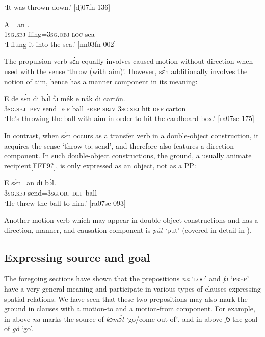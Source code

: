 \glt ‘It was thrown down.’ [dj07fn 136]
\z


\ea%
    \label{ex:key:967}
    \gll A    =an      .\\
\textsc{1sg.sbj}  fling=\textsc{3sg.obj}  \textsc{loc}  sea\\

\glt ‘I flung it into the sea.’ [nn03fn 002]
\z

The propulsion verb sɛ́n equally involves caused motion without direction when used with the sense ‘throw (with aim)’. However, sɛ́n additionally involves the notion of aim, hence has a manner component in its meaning:


\ea%
    \label{ex:key:968}
    \gll E    de  sɛ́n    di  bɔ́l  fɔ  mék  e    nák  di  cartón.\\
\textsc{3sg.sbj}  \textsc{ipfv}  send  \textsc{def}  ball  \textsc{prep}  \textsc{sbjv}  \textsc{3sg.sbj}  hit  \textsc{def}  carton\\

\glt ‘He’s throwing the ball with aim in order to hit the cardboard box.’ [ra07se 175]
\z

In contrast, when sɛ́n occurs as a transfer verb in a double-object construction, it acquires the sense ‘throw to; send’, and therefore also features a direction component. In such double-object constructions, the ground, a usually animate recipient[FFF9?], is only expressed as an object, not as a PP: 


\ea%
    \label{ex:key:969}
    \gll E    sɛ́n=an    di  bɔ́l.\\
\textsc{3sg.sbj}  send=\textsc{3sg.obj}  \textsc{def}  ball\\

\glt ‘He threw the ball to him.’ [ra07se 093]
\z

Another motion verb which may appear in double-object constructions and has a direction, manner, and causation component is \textit{pút} ‘put’ (covered in detail in ).

\subsection{Expressing source and goal}\label{sec:8.1.5}

The foregoing sections have shown that the prepositions \textit{na} ‘\textsc{loc}’ and \textit{fɔ} ‘\textsc{prep}’ have a very general meaning and participate in various types of clauses expressing spatial relations. We have seen that these two prepositions may also mark the ground in clauses with a motion-to and a motion-from component. For example, in  above \textit{na} marks the source of \textit{kɔmɔ́t} ‘go/come out of’, and in  above \textit{fɔ} the goal of \textit{gó} ‘go’. 


